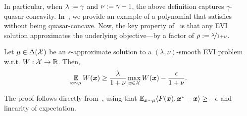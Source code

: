 In particular, when $\lambda := \gamma$ and $\nu := \gamma - 1$, the above definition captures $\gamma$-quasar-concavity. In~, we provide an example of a polynomial that satisfies~ without being quasar-concave. Now, the key property of~ is that any EVI solution approximates the underlying objective---by a factor of $\rho := \nicefrac{\lambda}{1 + \nu}$.

\begin{theorem}
    \label{theorem:smoothness}
    Let $\mu \in \Delta({\mathcal{X}})$ be an $\epsilon$-approximate solution to a $(\lambda, \nu)$-smooth EVI problem w.r.t. $W : {\mathcal{X}} \to \mathbb R$. Then,
    \begin{equation*}
        \operatorname*{\mathbb E}_{{\bm{x}} \sim \mu} W({\bm{x}})  \geq \frac{\lambda}{1 + \nu} \max_{{\bm{x}} \in {\mathcal{X}}} W({\bm{x}}) - \frac{\epsilon}{1 + \nu}.
    \end{equation*}
\end{theorem}

The proof follows directly from~, using that $\operatorname*{\mathbb E}_{{\bm{x}} \sim \mu} \langle F({\bm{x}}), {\bm{x}}^\star - {\bm{x}} \rangle \geq - \epsilon$ and linearity of expectation.